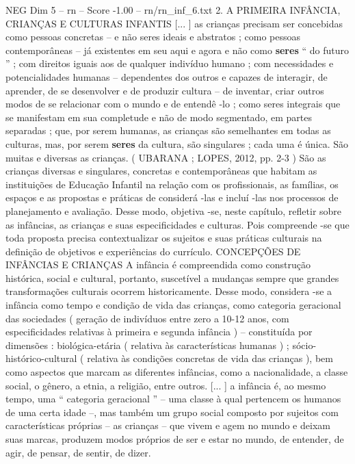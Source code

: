 \begin{textsample}{NEG Dim 5 – rn – Score -1.00 – rn/rn\_inf\_6.txt}  \label{ex:f5_neg_146}
2.
A PRIMEIRA INFÂNCIA, CRIANÇAS E CULTURAS INFANTIS [... ] as crianças precisam ser concebidas como pessoas concretas – e não seres ideais e abstratos ; como pessoas contemporâneas – já existentes em seu aqui e agora e não como \textbf{seres} “ do futuro ” ; com direitos iguais aos de qualquer indivíduo humano ; com necessidades e potencialidades humanas – dependentes dos outros e capazes de interagir, de aprender, de se desenvolver e de produzir cultura – de inventar, criar outros modos de se relacionar com o mundo e de entendê -lo ; como seres integrais que se manifestam em sua completude e não de modo segmentado, em partes separadas ; que, por serem humanas, as crianças são semelhantes em todas as culturas, mas, por serem \textbf{seres} da cultura, são singulares ; cada uma é única.
São muitas e diversas as crianças. ( UBARANA ; LOPES, 2012, pp. 2-3 ) São as crianças diversas e singulares, concretas e contemporâneas que habitam as instituições de Educação Infantil na relação com os profissionais, as famílias, os espaços e as propostas e práticas de considerá -las e incluí -las nos processos de planejamento e avaliação.
Desse modo, objetiva -se, neste capítulo, refletir sobre as infâncias, as crianças e suas especificidades e culturas.
Pois compreende -se que toda proposta precisa contextualizar os sujeitos e suas práticas culturais na definição de objetivos e experiências do currículo.
CONCEPÇÕES DE INFÂNCIAS E CRIANÇAS A infância é compreendida como construção histórica, social e cultural, portanto, suscetível a mudanças sempre que grandes transformações culturais ocorrem historicamente.
Desse modo, considera -se a infância como tempo e condição de vida das crianças, como categoria geracional das sociedades ( geração de indivíduos entre zero a 10-12 anos, com especificidades relativas à primeira e segunda infância ) – constituída por dimensões : biológica-etária ( relativa às características humanas ) ; sócio-histórico-cultural ( relativa às condições concretas de vida das crianças ), bem como aspectos que marcam as diferentes infâncias, como a nacionalidade, a classe social, o gênero, a etnia, a religião, entre outros. [... ] a infância é, ao mesmo tempo, uma “ categoria geracional ” – uma classe à qual pertencem os humanos de uma certa idade –, mas também um grupo social composto por sujeitos com características próprias – as crianças – que vivem e agem no mundo e deixam suas marcas, produzem modos próprios de ser e estar no mundo, de entender, de agir, de pensar, de sentir, de dizer.

\end{textsample}

